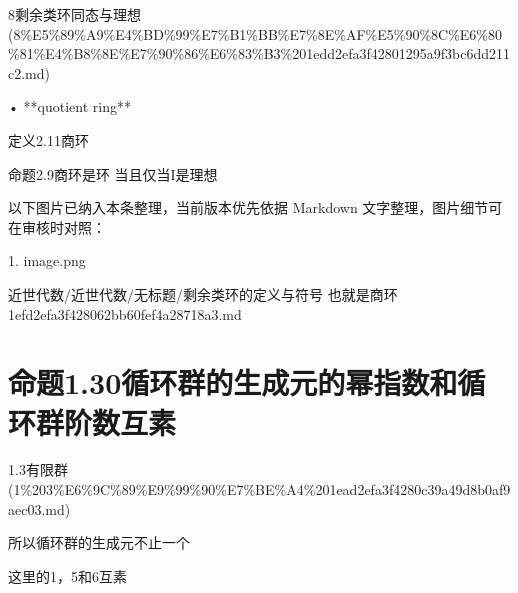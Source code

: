 \begin{note}[来源上级主题]

8剩余类环同态与理想 (8\%E5\%89\%A9\%E4\%BD\%99\%E7\%B1\%BB\%E7\%8E\%AF\%E5\%90\%8C\%E6\%80\%81\%E4\%B8\%8E\%E7\%90\%86\%E6\%83\%B3\%201edd2efa3f42801295a9f3bc6dd211c2.md)

\end{note}

\begin{definition}

• **quotient ring**

定义2.11商环

命题2.9商环是环 当且仅当I是理想

\end{definition}

\begin{note}[关联图片]
以下图片已纳入本条整理，当前版本优先依据 Markdown 文字整理，图片细节可在审核时对照：

1. image.png\\

\end{note}

\begin{note}[来源路径]

近世代数/近世代数/无标题/剩余类环的定义与符号 也就是商环 1efd2efa3f428062bb60fef4a28718a3.md

\end{note}

\section*{命题1.30循环群的生成元的幂指数和循环群阶数互素}

\begin{note}[来源上级主题]

1.3有限群 (1\%203\%E6\%9C\%89\%E9\%99\%90\%E7\%BE\%A4\%201ead2efa3f4280c39a49d8b0af9aec03.md)

\end{note}

\begin{proposition}[命题1.30循环群的生成元的幂指数和循环群阶数互素]

所以循环群的生成元不止一个

这里的1，5和6互素

\end{proposition}

